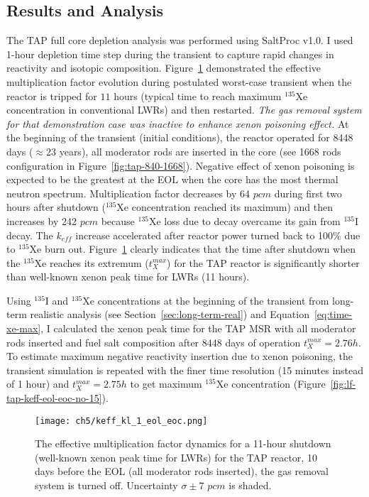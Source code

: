 \subsection{Results and Analysis}
The \gls{TAP} full core depletion analysis was performed using SaltProc v1.0. 
I used 1-hour depletion time step during the transient to capture rapid 
changes in reactivity and isotopic composition. 
Figure~\ref{fig:lf-tap-keff-eol-eoc-no} demonstrated the effective 
multiplication factor evolution during postulated worst-case transient when 
the reactor is tripped for $11$ hours (typical time to reach maximum 
$^{135}$Xe concentration in conventional \glspl{LWR}) and then restarted. 
\emph{The gas removal system for 
that demonstration case was inactive to enhance xenon poisoning effect.}
At the beginning of the transient 
(initial conditions), the reactor operated for 8448 days ($\approx23$ years), 
all moderator rods are inserted in the core (see 1668 rods configuration in 
Figure~\ref{fig:tap-840-1668}). Negative effect of xenon poisoning is expected 
to be the greatest at the \gls{EOL} when the core has the most thermal neutron 
spectrum. 
Multiplication factor decreases by 64 $pcm$ during first two hours after 
shutdown ($^{135}$Xe concentration reached its maximum) and then increases by 
242 $pcm$ because $^{135}$Xe loss due to decay overcame its gain from 
$^{135}$I decay. The $k_{eff}$ increase accelerated after reactor power turned 
back to 100\% due to $^{135}$Xe burn out. 
Figure~\ref{fig:lf-tap-keff-eol-eoc-no} clearly indicates that the time after 
shutdown when the $^{135}$Xe reaches its extremum ($t^{max}_X$) for the 
\gls{TAP} reactor is significantly shorter than well-known xenon peak time for 
\glspl{LWR} (11 hours).

Using $^{135}$I and $^{135}$Xe concentrations at the beginning of the 
transient from long-term realistic analysis (see 
Section~\ref{sec:long-term-real}) and Equation~\ref{eq:time-xe-max}, I 
calculated the xenon peak time for the \gls{TAP} \gls{MSR} with all moderator 
rods inserted and fuel salt composition after 8448 days of operation 
$t^{max}_X=2.76h$. To estimate maximum negative reactivity insertion due to 
xenon poisoning, the transient simulation is repeated with the finer time 
resolution (15 minutes instead of 1 hour) and $t^{max}_X=2.75h$ to get maximum 
$^{135}$Xe concentration (Figure~\ref{fig:lf-tap-keff-eol-eoc-no-15}).
\begin{figure}[htp!] %
	\centering
	\texttt{[image: ch5/keff\_kl\_1\_eol\_eoc.png]}
	\caption{The effective multiplication factor dynamics for a 11-hour 
	shutdown (well-known xenon peak time for \glspl{LWR}) for the TAP reactor, 
	10 days before the \gls{EOL} (all moderator rods inserted), the gas 
	removal system is turned off. Uncertainty $\sigma\pm7$ $pcm$ is shaded.}
	\label{fig:lf-tap-keff-eol-eoc-no}
\end{figure}

